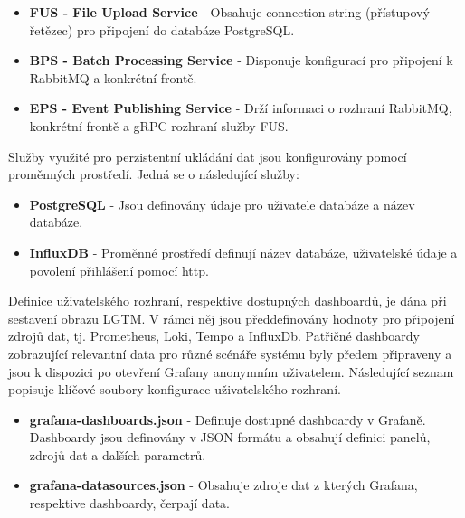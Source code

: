 \begin{itemize}
  \item \textbf{FUS - File Upload Service} - Obsahuje connection string (přístupový řetězec) pro připojení do databáze PostgreSQL.
  \item \textbf{BPS - Batch Processing Service} - Disponuje konfigurací pro připojení k RabbitMQ a konkrétní frontě.
  \item \textbf{EPS - Event Publishing Service} - Drží informaci o rozhraní RabbitMQ, konkrétní frontě a gRPC rozhraní služby FUS.
\end{itemize}

Služby využité pro perzistentní ukládání dat jsou konfigurovány pomocí proměnných prostředí. Jedná se o následující služby:

\begin{itemize}
  \item \textbf{PostgreSQL} - Jsou definovány údaje pro uživatele databáze a název databáze.
  \item \textbf{InfluxDB} - Proměnné prostředí definují název databáze, uživatelské údaje a povolení přihlášení pomocí http.
\end{itemize}

Definice uživatelského rozhraní, respektive dostupných dashboardů, je dána při sestavení obrazu LGTM. V rámci něj jsou předdefinovány hodnoty pro připojení zdrojů dat, tj. Prometheus, Loki, Tempo a InfluxDb. Patřičné dashboardy zobrazující relevantní data pro různé scénáře systému byly předem připraveny a jsou k dispozici po otevření Grafany anonymním uživatelem. Následující seznam popisuje klíčové soubory konfigurace uživatelského rozhraní.

\begin{itemize}
  \item \textbf{grafana-dashboards.json} - Definuje dostupné dashboardy v Grafaně. Dashboardy jsou definovány v JSON formátu a obsahují definici panelů, zdrojů dat a dalších parametrů.
  \item \textbf{grafana-datasources.json} - Obsahuje  zdroje dat z kterých Grafana, respektive dashboardy, čerpají data.
\end{itemize}